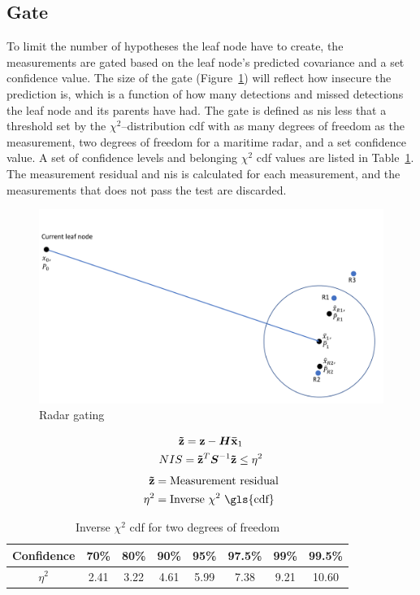 \subsection{Gate}
To limit the number of hypotheses the leaf node have to create, the measurements are gated based on the leaf node's predicted covariance and a set confidence value. The size of the gate (Figure~\ref{fig:radar_gating}) will reflect how insecure the prediction is, which is a function of how many detections and missed detections the leaf node and its parents have had. The gate is defined as \gls{nis} less that a threshold set by the \(\chi^2\)--distribution \gls{cdf} with as many degrees of freedom as the measurement, two degrees of freedom for a maritime radar, and a set confidence value. A set of confidence levels and belonging \(\chi^2\) \gls{cdf} values are listed in Table~\ref{tab:chi_square}. The measurement residual and \gls{nis} is calculated for each measurement, and the measurements that does not pass the test are discarded.
\begin{figure}
\centering
\includegraphics[width = .8\textwidth]{Figures/radar_gating.pdf}
\caption{Radar gating}\label{fig:radar_gating}
\end{figure}
\begin{equation}\label{eq:gate}
\begin{gathered}
\boldsymbol{\mathbf{\tilde{z}}} = \boldsymbol{\mathbf{z}} - \bm{H}\boldsymbol{\mathbf{\bar{x}}}_1 \\
NIS = \boldsymbol{\mathbf{\tilde{z}}}^T	\bm{S}^{-1} \boldsymbol{\mathbf{\tilde{z}}} \leq \eta^2
\end{gathered}
\end{equation}
\begin{equation*}
\begin{split}
\V{\tilde{z}}	&= \text{Measurement residual} \\
\eta^2 			&= \text{Inverse \(\chi^2\) \gls{cdf}} \\
\end{split}
\end{equation*}
\begin{table}
\centering
\begin{tabular}{c c c c c c c c}
Confidence 	& 70\% 	& 80\% 	& 90\% 	& 95\% 	& 97.5\% 	& 99\% 	& 99.5\% \\ 
\midrule
\(\eta^2\) 	& 2.41 	& 3.22 	& 4.61 	& 5.99 	& 7.38 		& 9.21 	& 10.60
\end{tabular}\caption{Inverse \(\chi^2\) \gls{cdf} for two degrees of freedom}
~\label{tab:chi_square}
\end{table}

